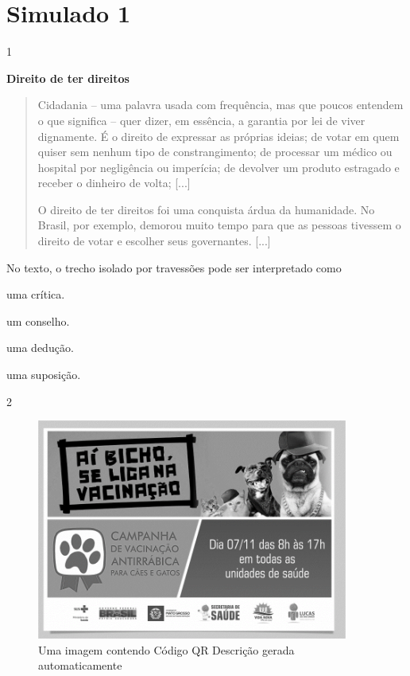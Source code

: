 \section{Simulado 1}

\num{1}

\textbf{Direito de ter direitos}

\begin{quote}
Cidadania -- uma palavra usada com frequência, mas que poucos entendem o
que significa -- quer dizer, em essência, a garantia por lei de viver
dignamente. É o direito de expressar as próprias ideias; de votar em
quem quiser sem nenhum tipo de constrangimento; de processar um médico
ou hospital por negligência ou imperícia; de devolver um produto
estragado e receber o dinheiro de volta; {[}...{]}

O direito de ter direitos foi uma conquista árdua da humanidade. No
Brasil, por exemplo, demorou muito tempo para que as pessoas tivessem o
direito de votar e escolher seus governantes. {[}...{]}
\end{quote}


No texto, o trecho isolado por travessões pode ser interpretado como

\begin{escolha}
\item uma crítica.

\item um conselho.

\item uma dedução.

\item uma suposição.
\end{escolha}

\num{2}

\begin{figure}
\centering
\includegraphics[width=4.03125in,height=2.85231in]{./imgSAEB_8_POR/media/image28.png}
\caption{Uma imagem contendo Código QR Descrição gerada automaticamente}
\end{figure}

